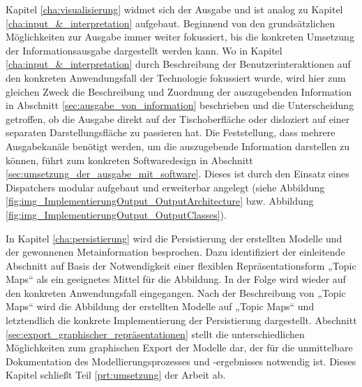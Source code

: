 Kapitel \ref{cha:visualisierung} widmet sich der Ausgabe und ist analog zu Kapitel \ref{cha:input_&_interpretation} aufgebaut. Beginnend von den grundsätzlichen Möglichkeiten zur Ausgabe immer weiter fokussiert, bis die konkreten Umsetzung der Informationsausgabe dargestellt werden kann. Wo in Kapitel \ref{cha:input_&_interpretation} durch Beschreibung der Benutzerinteraktionen auf den konkreten Anwendungsfall der Technologie fokussiert wurde, wird hier zum gleichen Zweck die Beschreibung und Zuordnung der auszugebenden Information in Abschnitt \ref{sec:ausgabe_von_information} beschrieben und die Unterscheidung getroffen, ob die Ausgabe direkt auf der Tischoberfläche oder disloziert auf einer separaten Darstellungsfläche zu passieren hat. Die Feststellung, dass mehrere Ausgabekanäle benötigt werden, um die auszugebende Information darstellen zu können, führt zum konkreten Softwaredesign in Abschnitt \ref{sec:umsetzung_der_ausgabe_mit_software}. Dieses ist durch den Einsatz eines Dispatchers modular aufgebaut und erweiterbar angelegt (siehe Abbildung \ref{fig:img_ImplementierungOutput_OutputArchitecture} bzw. Abbildung \ref{fig:img_ImplementierungOutput_OutputClasses}).

In Kapitel \ref{cha:persistierung} wird die Persistierung der erstellten Modelle und der gewonnenen Metainformation besprochen. Dazu identifiziert der einleitende Abschnitt auf Basis der Notwendigkeit einer flexiblen Repräsentationsform „Topic Maps“ als ein geeignetes Mittel für die Abbildung. In der Folge wird  wieder auf den konkreten Anwendungsfall eingegangen. Nach der Beschreibung von „Topic Maps“ wird die Abbildung der erstellten Modelle auf „Topic Maps“ und letztendlich die konkrete Implementierung der Persistierung dargestellt. Abschnitt \ref{sec:export_graphischer_repräsentationen} stellt die unterschiedlichen Möglichkeiten zum graphischen Export der Modelle dar, der für die unmittelbare Dokumentation des Modellierungsprozesses und -ergebnisses notwendig ist. Dieses Kapitel schließt Teil \ref{prt:umsetzung} der Arbeit ab.

